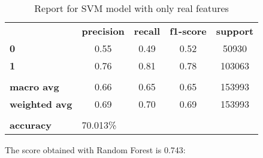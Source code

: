 \begin{table}[h!]
    \centering
    \begin{tabular}{lcccc}
        \rowcolor[HTML]{EEEEEE} 
        \cellcolor[HTML]{FBFBFB} & \textbf{precision} & \textbf{recall} & \textbf{f1-score} & \textbf{support} \\
        \rowcolor[HTML]{EEEEEE} 
        \textbf{0}               & 0.55               & 0.49            & 0.52              & 50930            \\
        \rowcolor[HTML]{EEEEEE} 
        \textbf{1}               & 0.76               & 0.81            & 0.78              & 103063           \\
        \rowcolor[HTML]{FBFBFB} 
        &                    &                 &                   &                  \\
        \rowcolor[HTML]{EEEEEE} 
        \textbf{macro avg}       & 0.66               & 0.65            & 0.65              & 153993           \\
        \rowcolor[HTML]{EEEEEE} 
        \textbf{weighted avg}    & 0.69               & 0.70            & 0.69              & 153993           \\
        \rowcolor[HTML]{FBFBFB} 
        &                    &                 &                   &                  \\
        \rowcolor[HTML]{EEEEEE} 
        \textbf{accuracy}        & \multicolumn{4}{l}{\cellcolor[HTML]{EEEEEE}70.013\%}                         
    \end{tabular}
    \caption{Report for SVM model with only real features}
    \label{tab:svm-res-real}
\end{table}

The score obtained with Random Forest is 0.743:

